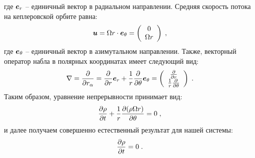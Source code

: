 где $\bm{e}_r$ -- единичный вектор в радиальном направлении. Средняя скорость потока на кеплеровской орбите равна:
\begin{equation}
    \bm{u} = \Omega r\cdot\bm{e}_{\theta}=\left(\begin{array}{c}
        0 \\ \Omega r
    \end{array}\right)\;,
\end{equation}
где $\bm{e}_{\theta}$ -- единичный вектор в азимутальном направлении. Также, векторный оператор набла в полярных координатах
имеет следующий вид:
\begin{equation}
    \nabla = \frac{\partial}{\partial r_{\alpha}} = \frac{\partial}{\partial r}\bm{e}_r+\frac{1}{r}\frac{\partial}{\partial\theta}\bm{e}_{\theta}=
    \left(\begin{array}{c}
        \frac{\partial}{\partial r} \\ \frac{1}{r}\frac{\partial}{\partial\theta}
    \end{array}\right)\;.
\end{equation}
Таким образом, уравнение непрерывности принимает вид:
\begin{equation}
    \frac{\partial\rho}{\partial t}+\frac{1}{r}\frac{\partial(\rho\Omega r)}{\partial\theta} = 0\;,
\end{equation}
и далее получаем совершенно естественный результат для нашей системы:
\begin{equation}
    \frac{\partial\rho}{\partial t} = 0\;.
\end{equation}

